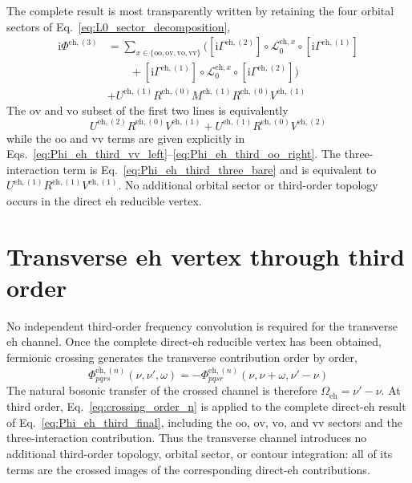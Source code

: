 \documentclass[aip,jcp,reprint,noshowkeys,superscriptaddress]{revtex4-1}
\newcommand{\ii}{\mathrm{i}}
\newcommand{\eh}{\text{eh}}
\newcommand{\teh}{\overline{\text{eh}}}
\begin{document}
The complete result is most transparently written by retaining the four
orbital sectors of Eq.~\eqref{eq:L0_sector_decomposition},
\begin{equation}
    \begin{split}
    \ii\Phi^{\eh,(3)}
    &=
    \sum_{x\in\{\text{oo},\text{ov},\text{vo},\text{vv}\}}
    \Big(
    \left[\ii\Gamma^{\eh,(2)}\right]
    \circ\mathcal L_0^{\eh,x}
    \circ\left[\ii\Gamma^{\eh,(1)}\right]
    \\
    &\qquad+
    \left[\ii\Gamma^{\eh,(1)}\right]
    \circ\mathcal L_0^{\eh,x}
    \circ\left[\ii\Gamma^{\eh,(2)}\right]
    \Big)
    \\
    &+
    U^{\eh,(1)}R^{\eh,(0)}M^{\eh,(1)}R^{\eh,(0)}V^{\eh,(1)}
    \end{split}
    \label{eq:Phi_eh_third_final}
\end{equation}
The $\text{ov}$ and $\text{vo}$ subset of the first two lines is equivalently
\begin{equation}
    U^{\eh,(2)}R^{\eh,(0)}V^{\eh,(1)}
    +
    U^{\eh,(1)}R^{\eh,(0)}V^{\eh,(2)}
    \label{eq:Phi_eh_third_ovvo_resolvent}
\end{equation}
while the $\text{oo}$ and $\text{vv}$ terms are given explicitly in
Eqs.~\eqref{eq:Phi_eh_third_vv_left}--\eqref{eq:Phi_eh_third_oo_right}.
The three-interaction term is Eq.~\eqref{eq:Phi_eh_third_three_bare} and is
equivalent to $U^{\eh,(1)}R^{\eh,(1)}V^{\eh,(1)}$.
No additional orbital sector or third-order topology occurs in the direct
$\eh$ reducible vertex.

\section{Transverse eh vertex through third order}
\label{sec:teh_third}

No independent third-order frequency convolution is required for the
transverse $\eh$ channel.
Once the complete direct-$\eh$ reducible vertex has been obtained,
fermionic crossing generates the transverse contribution order by order,
\begin{equation}
    \Phi^{\teh,(n)}_{pqrs}(\nu,\nu',\omega)
    =
    -
    \Phi^{\eh,(n)}_{pqsr}
    \left(\nu,\nu+\omega,\nu'-\nu\right)
    \label{eq:crossing_order_n}
\end{equation}
The natural bosonic transfer of the crossed channel is therefore
$\Omega_{\teh}=\nu'-\nu$.
At third order, Eq.~\eqref{eq:crossing_order_n} is applied to the complete
direct-$\eh$ result of Eq.~\eqref{eq:Phi_eh_third_final}, including the
$\text{oo}$, $\text{ov}$, $\text{vo}$, and $\text{vv}$ sectors and the
three-interaction contribution.
Thus the transverse channel introduces no additional third-order topology,
orbital sector, or contour integration: all of its terms are the crossed
images of the corresponding direct-$\eh$ contributions.
\end{document}
